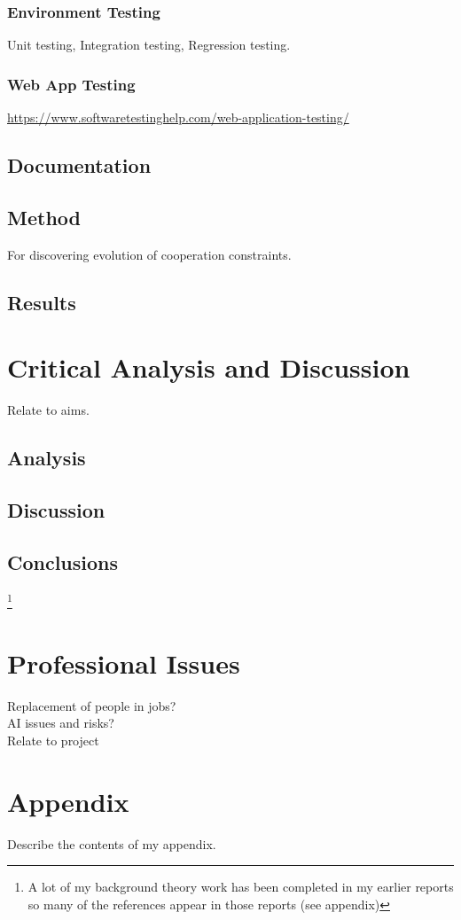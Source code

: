 \documentclass[]{final_report}
\begin{document}
\subsection{Environment Testing}
Unit testing, Integration testing, Regression testing.\\

\subsection{Web App Testing}
\url{https://www.softwaretestinghelp.com/web-application-testing/}

\section{Documentation}

\section{Method}
For discovering evolution of cooperation constraints.

\section{Results}


\chapter{Critical Analysis and Discussion}
Relate to aims.
\section{Analysis}

\section{Discussion}

\section{Conclusions}

\newpage
{}

\footnote{A lot of my background theory work has been completed in my earlier reports so many of the references appear in those reports (see appendix)}
\label{endpage}

\chapter{Professional Issues}
Replacement of people in jobs?\\
AI issues and risks?\\
Relate to project

\chapter{Appendix}
\label{appendix}
Describe the contents of my appendix.






\end{document}

